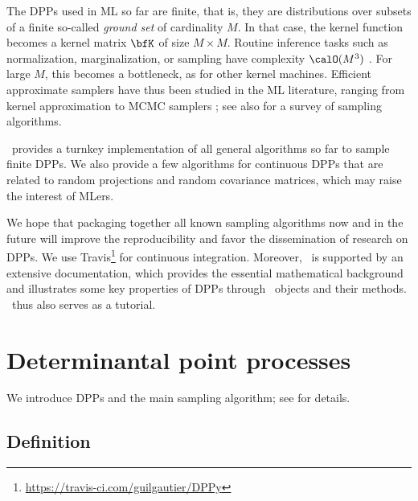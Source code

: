 \documentclass[twoside,11pt]{article}
\begin{document}
  The DPPs used in ML so far are finite, that is, they are distributions over subsets of a finite so-called \emph{ground set} of cardinality $M$.
  In that case, the kernel function becomes a kernel matrix $\bfK$ of size $M\times M$.
  Routine inference tasks such as normalization, marginalization, or sampling have complexity $\calO(M^3)$ \citep{KuTa12}.
  For large $M$, this becomes a bottleneck, as for other kernel machines. Efficient approximate samplers have thus been studied in the ML literature, ranging from kernel approximation \citep{AKFT13} to MCMC samplers \citep{AnGhRe16, LiJeSr16c, GaBaVa17}; see also \citet{TrBaAm18} for a survey of sampling algorithms.

  \DPPy\ provides a turnkey implementation of all general algorithms so far to sample finite DPPs.
  We also provide a few algorithms for continuous DPPs that are related to random projections and random covariance matrices, which may raise the interest of MLers.

  We hope that packaging together all known sampling algorithms now and in the future will improve the reproducibility and favor the dissemination of research on DPPs.
  \setcounter{footnote}{5}
  We use Travis\footnote{\url{https://travis-ci.com/guilgautier/DPPy}} for continuous integration. %
  Moreover, \DPPy\ is supported by an extensive documentation, which provides the essential mathematical background and illustrates some key properties of DPPs through \DPPy\ objects and their methods. \DPPy\ thus also serves as a tutorial.


\section{Determinantal point processes} %
\label{sec:determinantal_point_processes}

	We introduce DPPs and the main sampling algorithm; see \citep{HKPV06} for details.

  \subsection{Definition} %
  \label{sub:definition}
\end{document}
